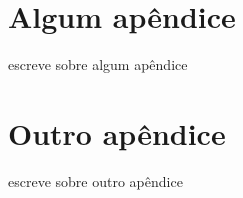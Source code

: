 \begin{apendicesenv}

    \partapendices

    \chapter{Algum apêndice}

    escreve sobre algum apêndice

    \chapter{Outro apêndice}

    escreve sobre outro apêndice

\end{apendicesenv}
